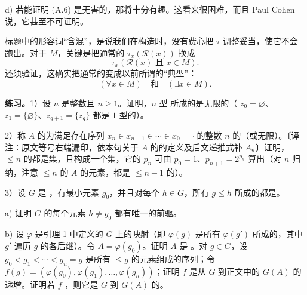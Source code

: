 d) 若能证明 (A.6) 是无害的，那将十分有趣。这看来很困难，而且 Paul Cohen 说，它甚至不可证明。

标题中的形容词“含混”，是说我们在构造时，没有费心把 $\tau$ 调整妥当，使它不会跑出。对于 $M$，关键是把通常的 $\tau_x(\mathscr R(x))$ 换成
\[
 \tau_x(\mathscr R(x)\text{ 且 }x\in M).
\]
还须验证，这确实把通常的变成以前所谓的“典型”：
\[
 (\forall x\in M)\quad\text{和}\quad(\exists x\in M).
\]

\textbf{练习。}1）设 $n$ 是整数且 $n\geq1$。证明，$n$ 型 所成的是无限的（ $z_0=\varnothing$、$z_1=\{\varnothing\}$、$z_{q+1}=\{z_q\}$ 都是 $1$ 型的）。

2）称 $A$ 的为满足存在序列 $x_n\in x_{n-1}\in\cdots\in x_0=\square$ 的整数 $n$ 的（或无限）。〔译注：原文等号右端漏印，依本句关于 $A$ 的的定义及后文递推式补 $A$。〕证明， $\leq n$ 的都是集，且构成一个集，它的 $p_n$ 可由 $p_0=1$、$p_{n+1}=2^{p_n}$ 算出（对 $n$ 归纳，注意 $\leq n$ 的 $A$ 的元素，都是 $\leq n-1$ 的）。

3）设 $G$ 是 ，有最小元素 $g_0$，并且对每个 $h\in G$，所有 $g\leq h$ 所成的都是。

a) 证明 $G$ 的每个元素 $h\ne g_0$ 都有唯一的前驱。

b) 设 $\varphi$ 是引理 1 中定义的 $G$ 上的映射（即 $\varphi(g)$ 是所有 $\varphi(g')$ 所成的，其中 $g'$ 遍历 $g$ 的各后继）。令 $A=\varphi(g_0)$。证明 $A$ 是 。对 $g\in G$，设 $g_0<g_1<\cdots<g_n=g$ 是所有 $\leq g$ 的元素组成的序列；令 $f(g)=(\varphi(g_0),\varphi(g_1),\ldots,\varphi(g_n))$；证明 $f$ 是从 $G$ 到正文中的 $G(A)$ 的递增。证明若 $f$ ，则它是 $G$ 到 $G(A)$ 的。

